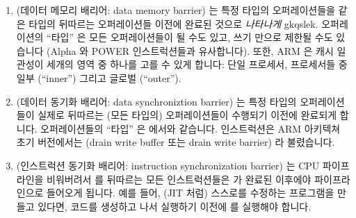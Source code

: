 \begin{enumerate}
\item	{} (데이터 메모리 배리어: data memory barrier) 는 특정 타입의
	오퍼레이션들을 같은 타입의 뒤따르는 오퍼레이션들 이전에 완료된 것으로
	\emph{나타나게} gkqslek.
	오퍼레이션의 ``타입'' 은 모든 오퍼레이션들이 될 수도 있고, 쓰기 만으로
	제한될 수도 있습니다 (Alpha  와 POWER  인스트럭션들과
	유사합니다).
	또한, ARM 은 캐시 일관성이 세개의 영역 중 하나를 고를 수 있게 합니다:
	단일 프로세서, 프로세서들 중 일부 (``inner'') 그리고 글로벌
	(``outer'').
\item	{} (데이터 동기화 배리어: data synchroniztion barrier) 는 특정
	타입의 오퍼레이션들이 실제로 뒤따르는 (모든 타입의) 오퍼레이션들이
	수행되기 이전에 완료되게 합니다.
	오퍼레이션들의 ``타입'' 은  에서와 같습니다.
	 인스트럭션은 ARM 아키텍쳐 초기 버전에서는  (drain
	write buffer 또는 drain write barrier) 라 불렸습니다.
\item	{} (인스트럭션 동기화 배리어: instruction synchronization
	barrier) 는 CPU 파이프라인을 비워버려서  를 뒤따르는 모든
	인스트럭션들은  가 완료된 이후에야 파이프라인으로 들어오게
	됩니다.
	예를 들어, (JIT 처럼) 스스로를 수정하는 프로그램을 만들고 있다면,
	코드를 생성하고 나서 실행하기 이전에  를 실행해야 합니다.

\end{enumerate}

